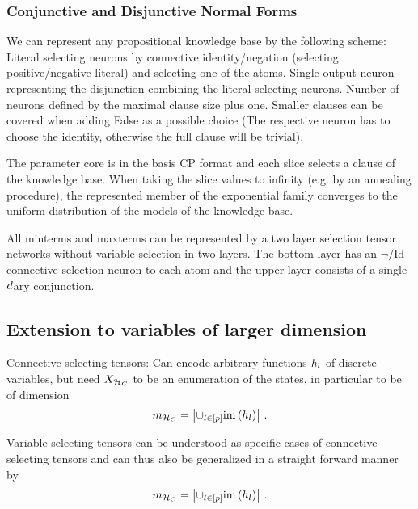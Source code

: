 \subsubsection{Conjunctive and Disjunctive Normal Forms}%

We can represent any propositional knowledge base by the following scheme:
Literal selecting neurons by connective identity/negation (selecting positive/negative literal) and selecting one of the atoms.
Single output neuron representing the disjunction combining the literal selecting neurons.
Number of neurons defined by the maximal clause size plus one.
Smaller clauses can be covered when adding False as a possible choice (The respective neuron has to choose the identity, otherwise the full clause will be trivial).

The parameter core is in the basis CP format and each slice selects a clause of the knowledge base.
When taking the slice values to infinity (e.g. by an annealing procedure), the represented member of the exponential family converges to the uniform distribution of the models of the knowledge base.




\begin{remark}
	All minterms and maxterms can be represented by a two layer selection tensor networks without variable selection in two layers.
	The bottom layer has an $\lnot/\mathrm{Id}$ connective selection neuron to each atom and the upper layer consists of a single $d$ary conjunction.
\end{remark}




\subsection{Extension to variables of larger dimension}

Connective selecting tensors: Can encode arbitrary functions $h_{l}$ of discrete variables, but need $X_{\mathcal{H}_{C}}$ to be an enumeration of the states, in particular to be of dimension
	\[ m_{\mathcal{H}_{C}} = \left| \cup_{l\in[p]} \mathrm{im}\left(h_{l}\right) \right| \, . \]
	
Variable selecting tensors can be understood as specific cases of connective selecting tensors and can thus also be generalized in a straight forward manner by
	\[ m_{\mathcal{H}_{C}} = \left| \cup_{l\in[p]} \mathrm{im}\left(h_{l}\right) \right| \, .  \]
	
